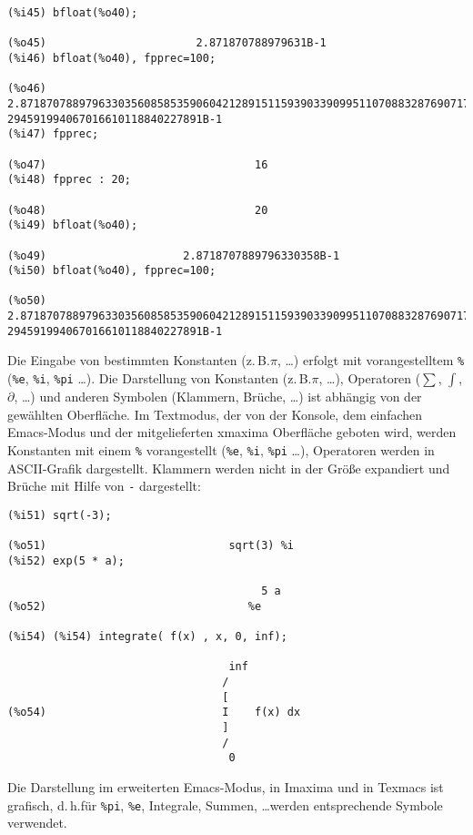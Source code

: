 \documentclass[ngerman,12pt]{scrartcl}
\newcommand*\zB{z.\,B.\xspace}
\begin{document}
\begin{verbatim}
(%i45) bfloat(%o40);

(%o45)                       2.871870788979631B-1
(%i46) bfloat(%o40), fpprec=100;

(%o46) 2.871870788979633035608585359060421289151159390339099511070883287690717#
294591994067016610118840227891B-1
(%i47) fpprec;

(%o47)                                16
(%i48) fpprec : 20;

(%o48)                                20
(%i49) bfloat(%o40);

(%o49)                     2.8718707889796330358B-1
(%i50) bfloat(%o40), fpprec=100;

(%o50) 2.871870788979633035608585359060421289151159390339099511070883287690717#
294591994067016610118840227891B-1
\end{verbatim}

Die Eingabe von bestimmten Konstanten (\zB $\pi$, \ldots) erfolgt mit
vorangestelltem \texttt{\%} (\texttt{\%e}, \texttt{\%i}, \texttt{\%pi} \ldots).
Die Darstellung von Konstanten (\zB $\pi$, \ldots), Operatoren
($\sum$, $\int$, $\partial$, \ldots) und anderen Symbolen (Klammern,
Brüche, \ldots) ist abhängig von der gewählten Oberfläche. Im
Textmodus, der von der Konsole, dem einfachen Emacs-Modus und der
mitgelieferten xmaxima Oberfläche geboten wird, werden Konstanten mit
einem \texttt{\%} vorangestellt (\texttt{\%e}, \texttt{\%i},
\texttt{\%pi} \ldots), Operatoren werden in ASCII-Grafik dargestellt.
Klammern werden nicht in der Größe expandiert und Brüche mit Hilfe von
\texttt{-} dargestellt:

\begin{verbatim}
(%i51) sqrt(-3);

(%o51)                            sqrt(3) %i
(%i52) exp(5 * a);

                                       5 a
(%o52)                               %e

(%i54) (%i54) integrate( f(x) , x, 0, inf);

                                  inf
                                 /
                                 [
(%o54)                           I    f(x) dx
                                 ]
                                 /
                                  0
\end{verbatim}

Die Darstellung im erweiterten Emacs-Modus, in Imaxima und in Texmacs
ist grafisch, d.\,h.\@ für \texttt{\%pi}, \texttt{\%e}, Integrale,
Summen, \ldots werden entsprechende Symbole verwendet.
\end{document}
